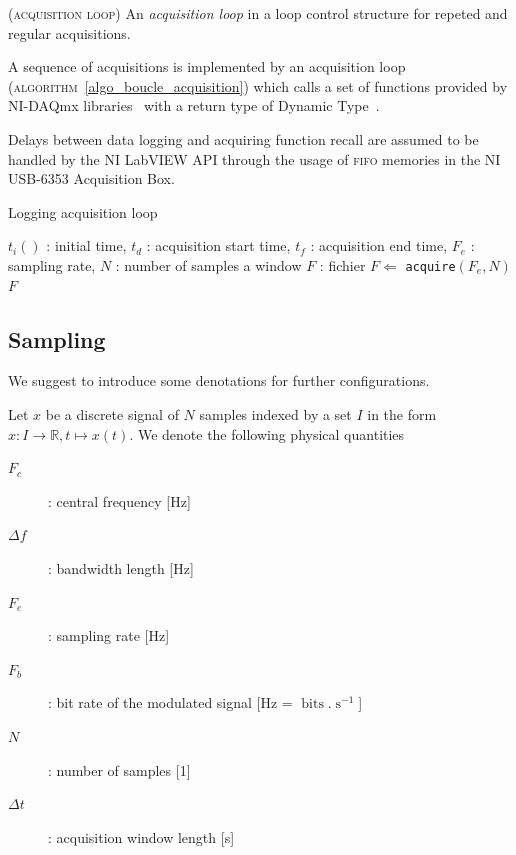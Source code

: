\documentclass[twocolumn,pre,floats,aps,amsmath,amssymb]{revtex4}
\newenvironment{notation}[1][Notation.]{\begin{trivlist}
\item[\hskip \labelsep {\bfseries #1}]}{\end{trivlist}}
\newenvironment{definition}[1][D\'efinition.]{\begin{trivlist}
\item[\hskip \labelsep {\bfseries #1}]}{\end{trivlist}}
\newenvironment{remark}[1][Remarque.]{\begin{trivlist}
\item[\hskip \labelsep {\bfseries #1}]}{\end{trivlist}}
\begin{document}
\begin{definition}
  (\textsc{acquisition loop})
  An \textit{acquisition loop} in a loop control structure for repeted and regular acquisitions.
\end{definition}

A sequence of acquisitions is implemented by an acquisition loop (\textsc{algorithm}~\ref{algo_boucle_acquisition}) which calls a set of functions provided by NI-DAQmx libraries~\cite{NI_acquisition_design_ref} with a return type of Dynamic Type~\cite{NI_Dynamic_data}.


\begin{remark}
  Delays between data logging and acquiring function recall are assumed to be handled by the NI LabVIEW API through the usage of \textsc{fifo} memories in the NI USB-6353 Acquisition Box\cite{NI_6353_datasheet}.
\end{remark}

\begin{algorithm}[h]
\caption{Logging acquisition loop}
\label{algo_boucle_acquisition}
\begin{algorithmic}[1]
  \REQUIRE $t_i()$ : initial time, $t_d$ : acquisition start time, $t_f$ : acquisition end time, $F_e$ : sampling rate, $N$ : number of samples a window
  \STATE $F$ : fichier
  \STATE $F \Leftarrow$ \texttt{acquire}$(F_e, N)$
  \ENDWHILE
  \RETURN $F$
\end{algorithmic}
\end{algorithm}

\subsection{Sampling}
We suggest to introduce some denotations for further configurations.

\begin{notation}
  Let $x$ be a discrete signal of $N$ samples indexed by a set $I$ in the form $x : I \rightarrow \mathbb{R}, t \mapsto x(t)$. We denote the following physical quantities
  \begin{description}
  \item[$F_c$]{ : central frequency [Hz]}
  \item[$\Delta f$]{ : bandwidth length [Hz]}
  \item[$F_e$]{ : sampling rate [Hz]}
  \item[$F_b$]{ : bit rate of the modulated signal [Hz = $\operatorname{bits}.\operatorname{s}^{-1}$]}
  \item[$N$]{ : number of samples [1]}
  \item[$\Delta t$]{ : acquisition window length [s]}
  \end{description}
\end{notation}
\end{document}
